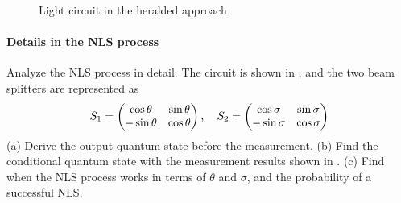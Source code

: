 \documentclass[hyperref, a4paper]{article}
\begin{document}
\begin{figure}
    \centering
    
    \caption{Light circuit in the heralded approach}
    \label{fig:heralded-circuit}
\end{figure}

\paragraph{}

\paragraph{Details in the NLS process} Analyze the NLS process in detail. 
The circuit is shown in , and the two beam splitters are represented as 
\begin{equation}
    S_1 = \pmqty{\cos \theta & \sin \theta \\
    - \sin \theta & \cos \theta}, \quad S_2 = \pmqty{\cos \sigma & \sin \sigma \\
    - \sin \sigma & \cos \sigma}
\end{equation}
(a) Derive the output quantum state before the measurement.
(b) Find the conditional quantum state with the measurement results shown in .
(c) Find when the NLS process works in terms of $\theta$ and $\sigma$, and the probability of a successful NLS.
\end{document}
